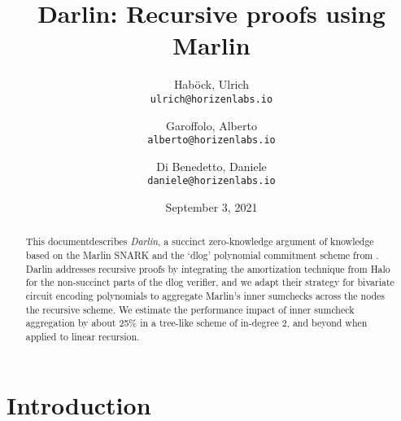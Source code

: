 \documentclass[10pt,article,oneside]{memoir}
\author{
    Hab{\"o}ck, Ulrich\\
    \texttt{ulrich@horizenlabs.io}
    \and
    Garoffolo, Alberto\\
    \texttt{alberto@horizenlabs.io}
    \and
    Di Benedetto, Daniele\\
    \texttt{daniele@horizenlabs.io}
}
\theoremstyle{definition}
\theoremstyle{remark}
\begin{document}
\title{%
Darlin: Recursive proofs using Marlin
}
\date{
September 3, 2021
}
\maketitle




\begin{abstract}
This document\footnotemark describes \textit{Darlin}, a succinct zero-knowledge argument of knowledge based on the  Marlin SNARK \cite{Marlin} and the `dlog' polynomial commitment scheme from \cite{BootleGroth, Bulletproofs}.
Darlin addresses recursive proofs by integrating the amortization technique from Halo \cite{Halo} for the non-succinct parts of the dlog verifier, and we adapt their strategy for bivariate circuit encoding polynomials to aggregate Marlin's inner sumchecks across the nodes the recursive scheme.
We estimate the performance impact of inner sumcheck aggregation by about 25\% in a tree-like scheme of in-degree $2$, and beyond when applied to linear recursion.
\end{abstract}


\begin{KeepFromToc}
  \tableofcontents
\end{KeepFromToc}

\chapter{Introduction}
\label{s:Introduction}
\end{document}
